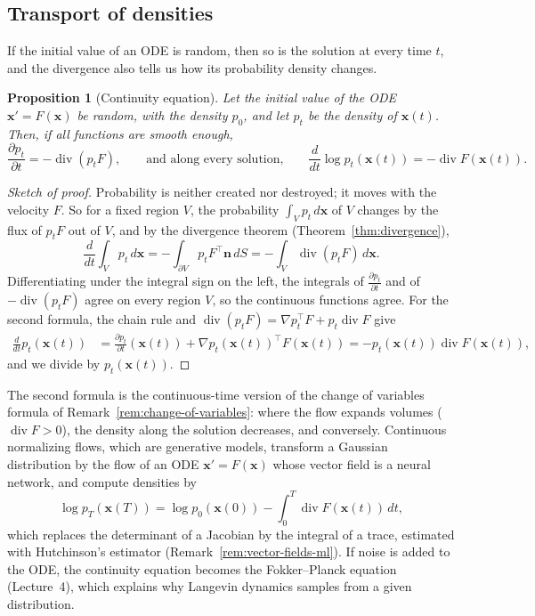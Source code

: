\documentclass[11pt]{article}
\theoremstyle{definition}
\theoremstyle{plain}
\newtheorem{proposition}[definition]{Proposition}
\theoremstyle{remark}
\DeclareMathOperator{\Div}{div}
\begin{document}
\subsection{Transport of densities}

If the initial value of an ODE is random, then so is the solution at every time $t$, and the divergence also tells us how its probability density changes.

\begin{proposition}[Continuity equation]\label{prop:continuity}
    Let the initial value of the ODE $\mathbf{x}' = F(\mathbf{x})$ be random, with the density $p_0$, and let $p_t$ be the density of $\mathbf{x}(t)$. Then, if all functions are smooth enough,
    \[\frac{\partial p_t}{\partial t} = -\Div(p_tF), \qquad \text{and along every solution,} \qquad \frac{d}{dt}\log p_t(\mathbf{x}(t)) = -\Div F(\mathbf{x}(t)).\]
\end{proposition}

\begin{proof}[Sketch of proof]
    Probability is neither created nor destroyed; it moves with the velocity $F$. So for a fixed region $V$, the probability $\int_V p_t\, d\mathbf{x}$ of $V$ changes by the flux of $p_tF$ out of $V$, and by the divergence theorem (Theorem~\ref{thm:divergence}),
    \[\frac{d}{dt}\int_V p_t\, d\mathbf{x} = -\int_{\partial V} p_tF^\top\mathbf{n}\, dS = -\int_V \Div(p_tF)\, d\mathbf{x}.\]
    Differentiating under the integral sign on the left, the integrals of $\frac{\partial p_t}{\partial t}$ and of $-\Div(p_tF)$ agree on every region $V$, so the continuous functions agree. For the second formula, the chain rule and $\Div(p_tF) = \nabla p_t^\top F + p_t\Div F$ give
    \begin{align*}
        \frac{d}{dt}p_t(\mathbf{x}(t)) &= \frac{\partial p_t}{\partial t}(\mathbf{x}(t)) + \nabla p_t(\mathbf{x}(t))^\top F(\mathbf{x}(t)) = -p_t(\mathbf{x}(t))\Div F(\mathbf{x}(t)),
    \end{align*}
    and we divide by $p_t(\mathbf{x}(t))$.
\end{proof}

The second formula is the continuous-time version of the change of variables formula of Remark~\ref{rem:change-of-variables}: where the flow expands volumes ($\Div F > 0$), the density along the solution decreases, and conversely. Continuous normalizing flows, which are generative models, transform a Gaussian distribution by the flow of an ODE $\mathbf{x}' = F(\mathbf{x})$ whose vector field is a neural network, and compute densities by
\[\log p_T(\mathbf{x}(T)) = \log p_0(\mathbf{x}(0)) - \int_0^T \Div F(\mathbf{x}(t))\, dt,\]
which replaces the determinant of a Jacobian by the integral of a trace, estimated with Hutchinson's estimator (Remark~\ref{rem:vector-fields-ml}). If noise is added to the ODE, the continuity equation becomes the Fokker--Planck equation (Lecture~4), which explains why Langevin dynamics samples from a given distribution.
\end{document}
